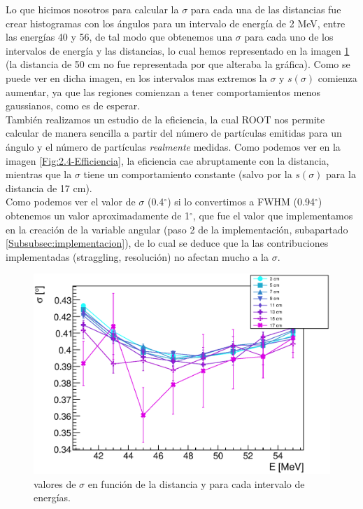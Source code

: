 \documentclass[12pt,a4paper]{article}
\numberwithin{equation}{section}
\numberwithin{figure}{section}
\begin{document}
Lo que hicimos nosotros para calcular la $\sigma$ para cada una de las distancias fue crear histogramas con los ángulos para un intervalo de energía de 2 MeV, entre las energías 40 y 56, de tal modo que obtenemos una $\sigma$ para cada uno de los intervalos de energía y las distancias, lo cual hemos representado en la imagen \ref{Fig:2.4-sigma} (la distancia de 50 cm no fue representada por que alteraba la gráfica). Como se puede ver en dicha imagen, en los intervalos mas extremos la $\sigma$ y $s(\sigma)$ comienza aumentar, ya que las regiones comienzan a tener comportamientos menos gaussianos, como es de esperar.  \\

También realizamos un estudio de la eficiencia, la cual ROOT nos permite calcular de manera sencilla a partir del número de partículas emitidas para un ángulo y el número de partículas {\it realmente} medidas. Como podemos ver en la imagen \ref{Fig:2.4-Efficiencia}, la eficiencia cae abruptamente con la distancia, mientras que la $\sigma$ tiene un comportamiento constante (salvo por la  $s(\sigma)$ para la distancia de 17 cm). \\

Como podemos ver el valor de $\sigma$ (0.4$^\circ$) si lo convertimos a FWHM (0.94$^\circ$) obtenemos un valor aproximadamente de 1$^\circ$, que fue el valor que implementamos en la creación de la variable angular (paso 2 de la implementación, subapartado \ref{Subsubsec:implementacion}), de lo cual se deduce  que la las contribuciones implementadas (straggling, resolución) no afectan mucho a la $\sigma$. 




\begin{figure}[h!] \centering
    \includegraphics[scale=0.8]{sigma.eps}
    \caption{valores de $\sigma$ en función de la distancia y para cada intervalo de energías.}
    \label{Fig:2.4-sigma}
\end{figure}
\end{document}
